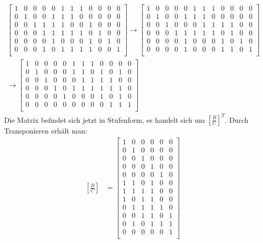 \documentclass[a4paper,10pt,ngerman]{scrartcl}
\begin{document}
\begin{align*}
\left[ \begin{array}{cccccc|cccccc}
1 & 0 & 0 & 0 & 0 & 1 & 1 & 1 & 0 & 0 & 0 & 0 \\
0 & 1 & 0 & 0 & 1 & 1 & 1 & 0 & 0 & 0 & 0 & 0 \\
0 & 0 & 1 & 1 & 1 & 1 & 0 & 0 & 1 & 0 & 0 & 0 \\
0 & 0 & 0 & 1 & 1 & 1 & 1 & 1 & 0 & 1 & 0 & 0 \\
0 & 0 & 0 & 0 & 1 & 0 & 0 & 0 & 1 & 0 & 1 & 0 \\
0 & 0 & 0 & 1 & 0 & 1 & 1 & 1 & 1 & 0 & 0 & 1 \\
\end{array} \right]
\rightarrow \left[ \begin{array}{cccccc|cccccc}
1 & 0 & 0 & 0 & 0 & 1 & 1 & 1 & 0 & 0 & 0 & 0 \\
0 & 1 & 0 & 0 & 1 & 1 & 1 & 0 & 0 & 0 & 0 & 0 \\
0 & 0 & 1 & 0 & 0 & 0 & 1 & 1 & 1 & 1 & 0 & 0 \\
0 & 0 & 0 & 1 & 1 & 1 & 1 & 1 & 0 & 1 & 0 & 0 \\
0 & 0 & 0 & 0 & 1 & 0 & 0 & 0 & 1 & 0 & 1 & 0 \\
0 & 0 & 0 & 0 & 1 & 0 & 0 & 0 & 1 & 1 & 0 & 1 \\
\end{array} \right] \\
\rightarrow \left[ \begin{array}{cccccc|cccccc}
1 & 0 & 0 & 0 & 0 & 1 & 1 & 1 & 0 & 0 & 0 & 0 \\
0 & 1 & 0 & 0 & 0 & 1 & 1 & 0 & 1 & 0 & 1 & 0 \\
0 & 0 & 1 & 0 & 0 & 0 & 1 & 1 & 1 & 1 & 0 & 0 \\
0 & 0 & 0 & 1 & 0 & 1 & 1 & 1 & 1 & 1 & 1 & 0 \\
0 & 0 & 0 & 0 & 1 & 0 & 0 & 0 & 1 & 0 & 1 & 0 \\
0 & 0 & 0 & 0 & 0 & 0 & 0 & 0 & 0 & 1 & 1 & 1 \\
\end{array} \right]
\end{align*}
Die Matrix befindet sich jetzt in Stufenform, es handelt sich um $\left[\frac{B}{C}\right]^T$. Durch Transponieren erhält man:
\begin{align*}
\left[\frac{B}{C}\right]&=\left[ \begin{array}{cccccc}
1 & 0 & 0 & 0 & 0 & 0 \\
0 & 1 & 0 & 0 & 0 & 0 \\
0 & 0 & 1 & 0 & 0 & 0 \\
0 & 0 & 0 & 1 & 0 & 0 \\
0 & 0 & 0 & 0 & 1 & 0 \\
1 & 1 & 0 & 1 & 0 & 0 \\
\hline
1 & 1 & 1 & 1 & 0 & 0 \\
1 & 0 & 1 & 1 & 0 & 0 \\
0 & 1 & 1 & 1 & 1 & 0 \\
0 & 0 & 1 & 1 & 0 & 1 \\
0 & 1 & 0 & 1 & 1 & 1 \\
0 & 0 & 0 & 0 & 0 & 1 \\
\end{array} \right]
\end{align*}
\end{document}
